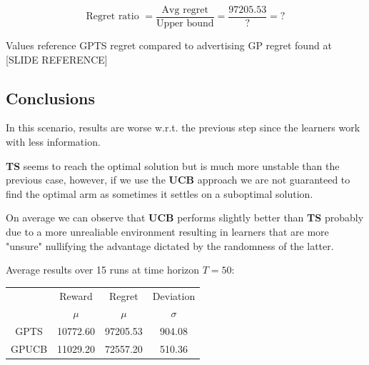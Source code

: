 \begin{displaymath}
	\text{Regret ratio } = \frac{\text{Avg regret}}{\text{Upper bound}} = \frac{97205.53}{?} = ?
\end{displaymath}

{\scriptsize Values reference GPTS regret compared to advertising GP regret found at [SLIDE REFERENCE]}


\subsection{Conclusions}

In this scenario, results are worse w.r.t. the previous step since the learners work with less information.

\textbf{TS} seems to reach the optimal solution but is much more unstable than the previous case, however, if we use the \textbf{UCB} approach we are not guaranteed to find the optimal arm as sometimes it settles on a suboptimal solution.

On average we can observe that \textbf{UCB} performs slightly better than \textbf{TS} probably due to a more unrealiable environment resulting in learners that are more "unsure" nullifying the advantage dictated by the randomness of the latter.

Average results over 15 runs at time horizon $T = 50$:

\begin{table}[h]
	\begin{tabular}{|c|cc|c|}
	\hline \hline
		\cellcolor{blue!25} & Reward 	& Regret	& Deviation \\
	\cline{2-4}
		\cellcolor{blue!25} & $\mu$		& $\mu$		& $\sigma$	\\
	\hline \hline
		GPTS 				& 10772.60	& 97205.53	& 904.08	\\
	\hline
		GPUCB				& 11029.20	& 72557.20	& 510.36	\\
	\hline \hline
	\end{tabular}
\end{table}

